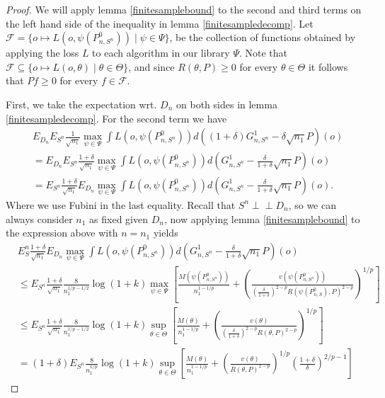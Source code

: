 \documentclass[11pt, a4paper]{article}
\newcommand{\indep}{\perp \!\!\! \perp}
\theoremstyle{definition}
\theoremstyle{remark}
\newcommand{\btheta}{\theta}
\newcommand{\la}{\psi}
\newcommand{\Sn}{S^n}
\newcommand{\lib}{\Psi}
\begin{document}
\begin{proof}[Proof]
    We will apply lemma \ref{finitesamplebound} to the second and third terms on the left hand side of the inequality in lemma \ref{finitesampledecomp}. Let $ \mathcal{F} = \{o \mapsto L(o, \la(P_{n,\Sn}^{0})) \mid \la \in \lib\}$, be the collection of functions obtained by applying the loss $ L $ to each algorithm in our library $ \lib$. Note that $ \mathcal{F} \subseteq \{o \mapsto L(o, \btheta) \mid \btheta \in \Theta\} $, and since $ R(\btheta, P) \geq 0 $ for every $ \btheta \in \Theta $ it follows that $ Pf \geq 0 $ for every $ f \in \mathcal{F} $.

First, we take the expectation wrt. $ D_n $ on both sides in lemma \ref{finitesampledecomp}. For the second term we have 
\begin{align*}
&E_{D_n} E_{\Sn} \frac{1}{\sqrt{n_1} } \max_{\la \in \lib} \int L(o, \la(P_{n, \Sn}^{0})) d ((1 + \delta) G_{n,\Sn}^{1} - \delta \sqrt{n_1} P)(o)\\
&= 
E_{D_n}E_{\Sn} \frac{1 + \delta}{\sqrt{n_1} } \max_{\la \in \lib} \int L(o, \la(P_{n, \Sn}^{0})) d (G_{n,\Sn}^{1} - \frac{\delta }{1 + \delta} \sqrt{n_1} P)(o)\\
&=E_{\Sn} \frac{1 + \delta}{\sqrt{n_1} } E_{D_n}\max_{\la \in \lib} \int L(o, \la(P_{n, \Sn}^{0})) d (G_{n,\Sn}^{1} - \frac{\delta }{1 + \delta} \sqrt{n_1} P)(o).
\end{align*}
Where we use Fubini in the last equality. Recall that $ \Sn \indep D_n $, so we can always consider $ n_1 $ as fixed given $ D_n $, now applying lemma \ref{finitesamplebound} to the expression above with $ n = n_1 $ yields 
\begin{align*}
&E_\Sn\frac{1 + \delta}{\sqrt{n_1} } E_{D_n} \max_{\la \in \lib} \int L(o, \la(P_{n, \Sn}^{0})) d (G_{n,\Sn}^{1} - \frac{\delta }{1 + \delta} \sqrt{n_1} P)(o) \\
&\leq E_{\Sn} \frac{1 + \delta}{\sqrt{n_1}} \frac{8}{n_1^{1/p-1/2}} \log(1 + k) \max_{\la \in \lib} \left[ \frac{M(\la(P_{n,\Sn}^{0}))}{n_1^{1-1/p}} + \left( \frac{v(\la(P_{n,\Sn}^0) )}{( \frac{\delta}{1 + \delta} )^{2-p} R(\la(P_{n,S}^{0}), P)^{2-p}} \right)^{1/p} \right] \\
&\leq E_{\Sn}\frac{1 + \delta}{\sqrt{n_1}} \frac{8}{n_1^{1/p-1/2}} \log(1 + k) \sup_{\btheta \in \Theta} \left[ \frac{M(\btheta)}{n_1^{1-1/p}} + \left( \frac{v(\btheta)}{( \frac{\delta}{1 + \delta} )^{2-p} R(\btheta,P)^{2-p}} \right)^{1/p} \right] \\
&= (1 + \delta) E_{\Sn}\frac{8}{n_1^{1/p}} \log(1 + k) \sup_{\btheta \in \Theta} \left[ \frac{M(\btheta)}{n_1^{1-1/p}} + \left( \frac{v(\btheta)}{R(\btheta,P)^{2-p}} \right)^{1/p}\left( \frac{1 + \delta}{\delta}  \right)^{2/p-1} \right]  

\end{align*}
\end{proof}
\end{document}
